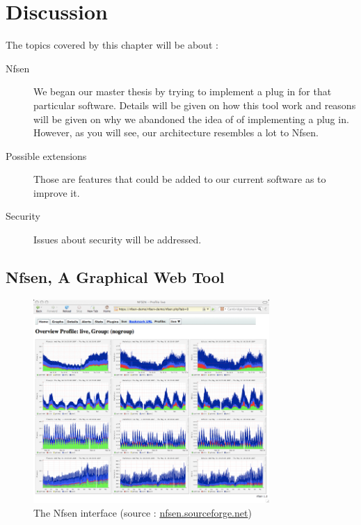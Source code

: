 \chapter{Discussion}

The topics covered by this chapter will be about :

\begin{description}
	\item[Nfsen] We began our master thesis by trying to implement a plug in for that particular software. Details will be given on how this tool work and reasons will be given on why we abandoned the idea of of implementing a plug in. However, as you will see, our architecture resembles a lot to Nfsen.
	\item[Possible extensions] Those are features that could be added to our current software as to improve it.
	\item[Security] Issues about security will be addressed.
\end{description}

\section{Nfsen, A Graphical Web Tool}

\begin{figure}[!h]
	\centering
	\includegraphics[width=0.8\textwidth]{res/nfsen.png}
	\caption{The Nfsen interface (source : \url{nfsen.sourceforge.net})}
	\label{fig:nfsen}
\end{figure}

